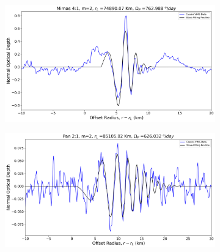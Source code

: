 \documentclass{article}
\begin{document}
\begin{figure}[h]
    \centering

    \begin{subfigure}{0.35\linewidth}
        \includegraphics[width=\linewidth]{mimas41_wavefit.png}
        \label{fig:mimas41}
    \end{subfigure}
    \hspace{1\linewidth} %

    \begin{subfigure}{0.35\linewidth}
        \includegraphics[width=\linewidth]{pan_21_wavefit.png}
        \label{fig:pan21}
    \end{subfigure}
    \hspace{1\linewidth}


\end{figure}
\end{document}
